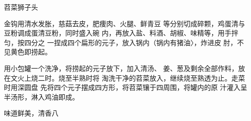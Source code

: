 \begin{recipe}{苕菜狮子头}

\ingredients



\cooking

\step 	金钩用清水发胀，慈菇去皮，肥痩肉、火腿、鲜青豆 等分别切成碎颗，鸡蛋清与豆粉调成蛋清豆粉，同时盛入碗 内，再放入盐、料酒、胡椒、味精等，用手拌匀，按四分之 一捏成四个扁形的元子，放入锅内（锅内有猪油〉，炸进皮 肘，不见黄色即捞起。

\step 	用小包罐一个洗净，将捞起的元子放下，加入清汤、 姜、葱及剩余全部作料，放在文火上烧二时。烧至半熟时将 淘洗干净的苕菜放入，继续烧至熟透为止。走菜时用深圆盘 先将四个元子摆成四方形，将苕菜镶于四周围，将罐内的原 汁灌入呈半汤形，淋入鸡油即成。

\notes

味道鲜美，清香八

\end{recipe}

